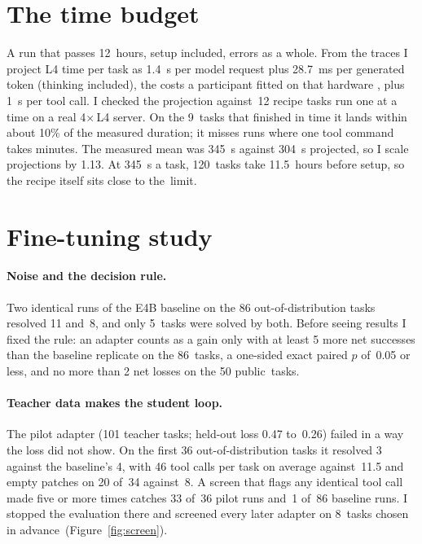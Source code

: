 \section{The time budget}\label{sec:time}

A run that passes 12~hours, setup included, errors as a whole. From the traces I project L4 time per task as 1.4~s per model request plus 28.7~ms per generated token (thinking included), the costs a participant fitted on that hardware \citep{forumspeed}, plus 1~s per tool call. I checked the projection against~12 recipe tasks run one at a time on a real 4$\times$\,L4 server. On the 9~tasks that finished in time it lands within about 10\% of the measured duration; it misses runs where one tool command takes minutes. The measured mean was 345~s against 304~s projected, so I scale projections by 1.13. At 345~s a task, 120~tasks take 11.5~hours before setup, so the recipe itself sits close to the~limit.


\section{Fine-tuning study}\label{sec:finetune}

\paragraph{Noise and the decision rule.} Two identical runs of the E4B baseline on the 86 out-of-distribution tasks resolved 11 and~8, and only 5~tasks were solved by both. Before seeing results I fixed the rule: an adapter counts as a gain only with at least 5 more net successes than the baseline replicate on the 86~tasks, a one-sided exact paired $p$ of~0.05 or less, and no more than 2 net losses on the 50 public~tasks.

\paragraph{Teacher data makes the student loop.} The pilot adapter (101 teacher tasks; held-out loss 0.47 to~0.26) failed in a way the loss did not show. On the first 36 out-of-distribution tasks it resolved 3 against the baseline's 4, with 46 tool calls per task on average against~11.5 and empty patches on 20 of~34 against~8. A screen that flags any identical tool call made five or more times catches 33 of~36 pilot runs and~1 of~86 baseline runs. I stopped the evaluation there and screened every later adapter on 8~tasks chosen in advance~(Figure~\ref{fig:screen}).

